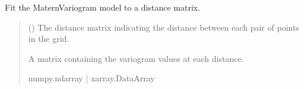 \documentclass[letterpaper,10pt,english]{sphinxmanual}
\begin{document}
\begin{fulllineitems}
\begin{fulllineitems}
\label{\detokenize{covariance:glomar_gridding.variogram.MaternVariogram.fit}}
\pysigstartsignatures
\pysiglinewithargsret
{}
{}
{}
\pysigstopsignatures
\sphinxAtStartPar
Fit the MaternVariogram model to a distance matrix.
\begin{quote}\begin{description}
\sphinxAtStartPar
{} (\sphinxstyleliteralemphasis{\sphinxupquote{ | }}) \textendash{} The distance matrix indicating the distance between each pair of
points in the grid.

\sphinxAtStartPar
A matrix containing the variogram values at each distance.

\sphinxAtStartPar
numpy.ndarray | xarray.DataArray

\end{description}\end{quote}

\end{fulllineitems}


\end{fulllineitems}

\end{document}
